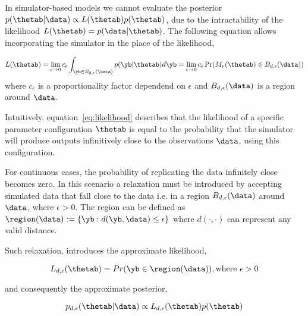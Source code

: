 In simulator-based models we cannot evaluate the posterior
$p(\thetab|\data) \propto L(\thetab)p(\thetab)$, due to the
intractability of the likelihood $L(\thetab) = p(\data|\thetab)$. The
following equation allows incorporating the simulator in the place of
the likelihood,

\begin{equation} \label{eq:likelihood}
  L(\thetab) =
  \lim_{\epsilon \to 0} c_\epsilon \int_{\yb \in B_{d,\epsilon}(\data)} p(\yb|\thetab)d\yb =
  \lim_{\epsilon \to 0} c_\epsilon \Pr(M_r(\thetab) \in B_{d,\epsilon}(\data))
\end{equation}
%
where $c_\epsilon$ is a proportionality factor dependend on
$\epsilon$ and $B_{d,\epsilon}(\data)$ is a region around $\data$.

Intuitively, equation~\ref{eq:likelihood} describes that the
likelihood of a specific parameter configuration $\thetab$ is equal to
the probability that the simulator will produce outputs infinitively
close to the observations $\data$, using this configuration.

For continuous cases, the probability of replicating the data
infinitely close becomes zero. In this scenario a relaxation must be
introduced by accepting simulated data that fall close to the data
i.e. in a region $B_{d,\epsilon}(\data)$ around $\data$, where
$\epsilon > 0$. The region can be
defined as $\region (\data) := \{\yb: d(\yb, \data) \leq \epsilon \}$
where $d(\cdot, \cdot)$ can represent any valid distance.

Such relaxation, introduces the approximate likelihood,

\begin{equation} \label{eq:approx_likelihood}
  L_{d, \epsilon}(\thetab) = Pr(\yb \in \region(\data)), \text{where  } \epsilon > 0
\end{equation}

and consequently the approximate posterior,

\begin{equation} \label{eq:approx_posterior}
  p_{d,\epsilon}(\thetab|\data) \propto L_{d, \epsilon}(\thetab) p(\thetab)
\end{equation}